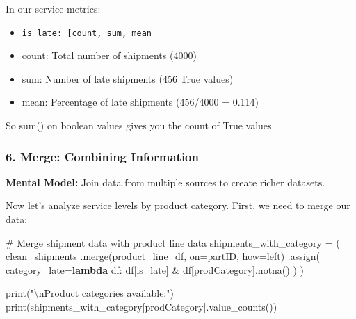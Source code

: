 \documentclass[
  letterpaper,
  DIV=11,
  numbers=noendperiod]{scrartcl}
\newenvironment{Shaded}{\begin{snugshade}}{\end{snugshade}}
\newcommand{\BuiltInTok}[1]{\textcolor[rgb]{0.00,0.23,0.31}{#1}}
\newcommand{\CharTok}[1]{\textcolor[rgb]{0.13,0.47,0.30}{#1}}
\newcommand{\CommentTok}[1]{\textcolor[rgb]{0.37,0.37,0.37}{#1}}
\newcommand{\KeywordTok}[1]{\textcolor[rgb]{0.00,0.23,0.31}{\textbf{#1}}}
\newcommand{\NormalTok}[1]{\textcolor[rgb]{0.00,0.23,0.31}{#1}}
\newcommand{\OperatorTok}[1]{\textcolor[rgb]{0.37,0.37,0.37}{#1}}
\newcommand{\StringTok}[1]{\textcolor[rgb]{0.13,0.47,0.30}{#1}}
\providecommand{\tightlist}{%
  \setlength{\itemsep}{0pt}\setlength{\parskip}{0pt}}
\begin{document}
In our service metrics:

\begin{itemize}
\tightlist
\item
  \texttt{\textquotesingle{}is\_late\textquotesingle{}:\ {[}\textquotesingle{}count\textquotesingle{},\ \textquotesingle{}sum\textquotesingle{},\ \textquotesingle{}mean\textquotesingle{}{]}}
\item
  count: Total number of shipments (4000)
\item
  sum: Number of late shipments (456 True values)
\item
  mean: Percentage of late shipments (456/4000 = 0.114)
\end{itemize}

So sum() on boolean values gives you the count of True values.

\subsubsection{6. Merge: Combining
Information}\label{merge-combining-information}

\textbf{Mental Model:} Join data from multiple sources to create richer
datasets.

Now let's analyze service levels by product category. First, we need to
merge our data:

\label{mental-model-6-merge-prep}
\begin{Shaded}
\begin{Highlighting}[]
\CommentTok{\# Merge shipment data with product line data}
\NormalTok{shipments\_with\_category }\OperatorTok{=}\NormalTok{ (}
\NormalTok{    clean\_shipments}
\NormalTok{    .merge(product\_line\_df, on}\OperatorTok{=}\StringTok{\textquotesingle{}partID\textquotesingle{}}\NormalTok{, how}\OperatorTok{=}\StringTok{\textquotesingle{}left\textquotesingle{}}\NormalTok{)}
\NormalTok{    .assign(}
\NormalTok{        category\_late}\OperatorTok{=}\KeywordTok{lambda}\NormalTok{ df: df[}\StringTok{\textquotesingle{}is\_late\textquotesingle{}}\NormalTok{] }\OperatorTok{\&}\NormalTok{ df[}\StringTok{\textquotesingle{}prodCategory\textquotesingle{}}\NormalTok{].notna()}
\NormalTok{    )}
\NormalTok{)}

\BuiltInTok{print}\NormalTok{(}\StringTok{"}\CharTok{\textbackslash{}n}\StringTok{Product categories available:"}\NormalTok{)}
\BuiltInTok{print}\NormalTok{(shipments\_with\_category[}\StringTok{\textquotesingle{}prodCategory\textquotesingle{}}\NormalTok{].value\_counts())}
\end{Highlighting}
\end{Shaded}
\end{document}
